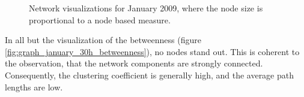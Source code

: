 \begin{figure}[htpb]
{				}
	\qquad 			
	\qquad 
		
	\caption[Network visualizations where the node size is proportional to node based measures]{Network visualizations for January 2009, where the node size is proportional to a node based measure.}
	\label{fig:graph_january_30h_node_based_measures} 
	 
\end{figure}

In all but the visualization of the betweenness (figure \ref{fig:graph_january_30h_betweenness}), no nodes stand out. This is coherent to the observation, that the network components are strongly connected. Consequently, the clustering coefficient is generally high, and the average path lengths are low.  

